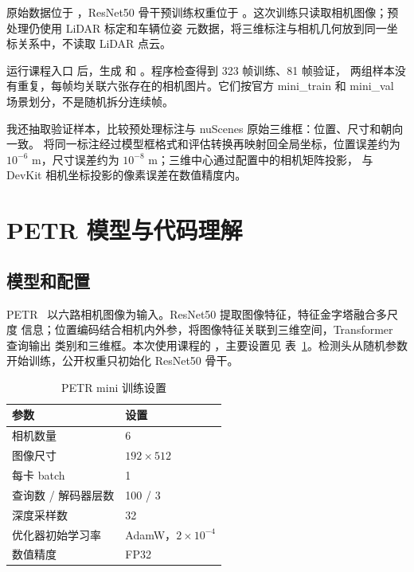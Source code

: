 \documentclass[UTF8,zihao=5,scheme=chinese]{ctexart}
\begin{document}
原始数据位于 ，ResNet50 骨干预训练权重位于
。这次训练只读取相机图像；预处理仍使用 LiDAR 标定和车辆位姿
元数据，将三维标注与相机几何放到同一坐标关系中，不读取 LiDAR 点云。

运行课程入口  后，生成
 和
。程序检查得到 323 帧训练、81 帧验证，
两组样本没有重复，每帧均关联六张存在的相机图片。它们按官方 mini\_train 和 mini\_val
场景划分，不是随机拆分连续帧。

我还抽取验证样本，比较预处理标注与 nuScenes 原始三维框：位置、尺寸和朝向一致。
将同一标注经过模型框格式和评估转换再映射回全局坐标，位置误差约为
$10^{-6}$ m，尺寸误差约为 $10^{-8}$ m；三维中心通过配置中的相机矩阵投影，
与 DevKit 相机坐标投影的像素误差在数值精度内。

\section{PETR 模型与代码理解}

\subsection{模型和配置}

PETR~\cite{petr} 以六路相机图像为输入。ResNet50 提取图像特征，特征金字塔融合多尺度
信息；位置编码结合相机内外参，将图像特征关联到三维空间，Transformer 查询输出
类别和三维框。本次使用课程的
，主要设置见
表~\ref{tab:config}。检测头从随机参数开始训练，公开权重只初始化 ResNet50 骨干。

\begin{table}[htbp]
  \centering
  \caption{PETR mini 训练设置}
  \label{tab:config}
  \begin{tabular}{ll}
    \toprule
    参数 & 设置 \\
    \midrule
    相机数量 & 6 \\
    图像尺寸 & $192\times512$ \\
    每卡 batch & 1 \\
    查询数 / 解码器层数 & 100 / 3 \\
    深度采样数 & 32 \\
    优化器初始学习率 & AdamW，$2\times10^{-4}$ \\
    数值精度 & FP32 \\
    \bottomrule
  \end{tabular}
\end{table}
\end{document}

